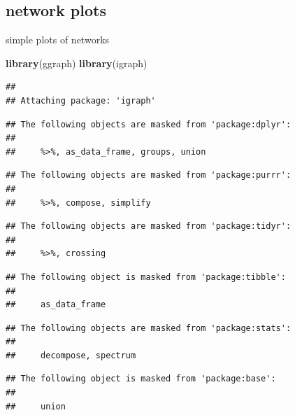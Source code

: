 \documentclass[]{article}
\newenvironment{Shaded}{}{}
\newcommand{\KeywordTok}[1]{\textcolor[rgb]{0.00,0.44,0.13}{\textbf{{#1}}}}
\newcommand{\NormalTok}[1]{{#1}}
\begin{document}
\subsection{network plots}\label{network-plots}

simple plots of networks

\begin{Shaded}
\begin{Highlighting}[]
\KeywordTok{library}\NormalTok{(ggraph)}
\KeywordTok{library}\NormalTok{(igraph)}
\end{Highlighting}
\end{Shaded}

\begin{verbatim}
## 
## Attaching package: 'igraph'
\end{verbatim}

\begin{verbatim}
## The following objects are masked from 'package:dplyr':
## 
##     %>%, as_data_frame, groups, union
\end{verbatim}

\begin{verbatim}
## The following objects are masked from 'package:purrr':
## 
##     %>%, compose, simplify
\end{verbatim}

\begin{verbatim}
## The following objects are masked from 'package:tidyr':
## 
##     %>%, crossing
\end{verbatim}

\begin{verbatim}
## The following object is masked from 'package:tibble':
## 
##     as_data_frame
\end{verbatim}

\begin{verbatim}
## The following objects are masked from 'package:stats':
## 
##     decompose, spectrum
\end{verbatim}

\begin{verbatim}
## The following object is masked from 'package:base':
## 
##     union
\end{verbatim}
\end{document}
